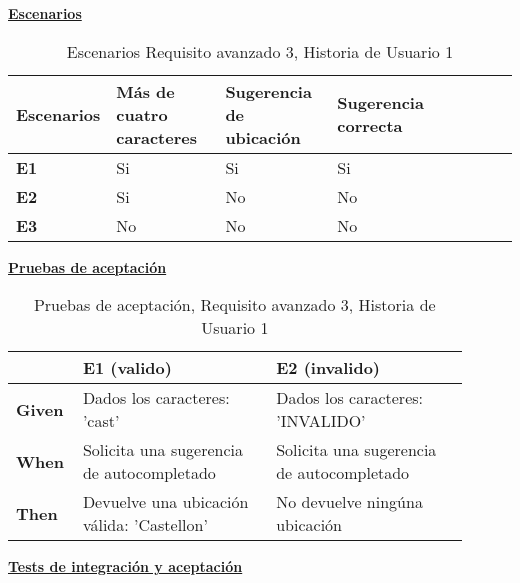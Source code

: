 \documentclass[../ei103948-project-documentation.tex]{subfiles}
\begin{document}
							\begin{center}
								\textbf{\underline{Escenarios}}
								\begin{table}[H]
									\centering
									\begin{tabular}{|p{0.14\linewidth}|p{0.24\linewidth}|p{0.24\linewidth}|p{0.24\linewidth}|p{0.12\linewidth}|p{0.12\linewidth}|p{0.12\linewidth}|}
										\hline
										\textbf{Escenarios} & \textbf{Más de cuatro caracteres} & \textbf{Sugerencia de ubicación} & \textbf{Sugerencia correcta} \\ \hline
										\textbf{E1}         & Si                                & Si                 		   & Si                  \\ \hline
										\textbf{E2}         & Si                                & No                           & No                           \\ \hline
										\textbf{E3}         & No                                & No                           & No                           \\ \hline
										\end{tabular}
									\caption{Escenarios Requisito avanzado 3, Historia de Usuario 1}
								\end{table}

								\descripcionAvanzadaH

								\textbf{\underline{Pruebas de aceptación}}
								\begin{table}[H]
									\centering
									\begin{tabular}{|p{0.10\linewidth}|p{0.40\linewidth}|p{0.40\linewidth}|}
										\hline
										\textbf{}      & \textbf{E1 (valido)}                      & \textbf{E2 (invalido)}                    \\ \hline
										\textbf{Given} & Dados los caracteres: 'cast'              & Dados los caracteres: 'INVALIDO'            \\ \hline
										\textbf{When}  & Solicita una sugerencia de autocompletado & Solicita una sugerencia de autocompletado \\ \hline
										\textbf{Then}  & Devuelve una ubicación válida: 'Castellon'     & No devuelve ningúna ubicación                  \\ \hline
										\end{tabular}
									\caption{Pruebas de aceptación, Requisito avanzado 3, Historia de Usuario 1}
								\end{table}
								\end{center}

								\newpage


								\begin{center}
									\textbf{\underline{Tests de integración y aceptación}}
								\end{center}

								\testAvanzadoH
\end{document}
